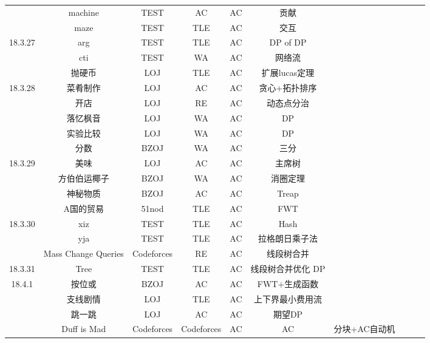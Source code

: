 \documentclass[landscape]{article}
\begin{document}
\begin{longtable}{cccccccccc}
  & machine & TEST & AC & AC & 贡献\\
  & maze & TEST & TLE & AC & 交互\\
  \hline
  18.3.27 & arg & TEST & TLE & AC & DP of DP\\
  & cti & TEST & WA & AC & 网络流\\
  & 抛硬币 & LOJ & TLE & AC & 扩展lucas定理\\
  \hline
  18.3.28 & 菜肴制作 & LOJ & AC & AC & 贪心+拓扑排序\\
  & 开店 & LOJ & RE & AC & 动态点分治\\
  & 落忆枫音 & LOJ & WA & AC & DP\\
  & 实验比较 & LOJ & WA & AC & DP\\
  & 分数 & BZOJ & WA & AC & 三分\\
  \hline
  18.3.29 & 美味 & LOJ & AC & AC & 主席树\\
  & 方伯伯运椰子 & BZOJ & WA & AC & 消圈定理\\
  & 神秘物质 & BZOJ & AC & AC & Treap\\
  & A国的贸易 & 51nod & TLE & AC & FWT\\
  \hline
  18.3.30 & xiz & TEST & TLE & AC & Hash\\
  & yja & TEST & TLE & AC & 拉格朗日乘子法\\
  & Mass Change Queries & Codeforces & RE & AC & 线段树合并\\
  \hline
  18.3.31 & Tree & TEST & TLE & AC & 线段树合并优化 DP\\
  \hline
  18.4.1 & 按位或 & BZOJ & AC & AC & FWT+生成函数\\
  & 支线剧情 & LOJ & TLE & AC & 上下界最小费用流\\
  & 跳一跳 & LOJ & AC & AC & 期望DP\\
  & Duff is Mad & Codeforces & Codeforces & AC & AC & 分块+AC自动机\\
  
\end{longtable}
\end{document}
